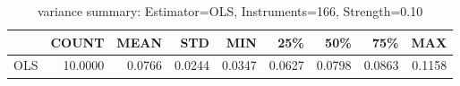 \begin{table}[ht]
\centering
\caption{variance summary: Estimator=OLS, Instruments=166, Strength=0.10}
\begin{tabular}{lrrrrrrrr}
\toprule
 & COUNT & MEAN & STD & MIN & 25\% & 50\% & 75\% & MAX \\
\midrule
OLS & 10.0000 & 0.0766 & 0.0244 & 0.0347 & 0.0627 & 0.0798 & 0.0863 & 0.1158 \\
\bottomrule
\end{tabular}
\end{table}

